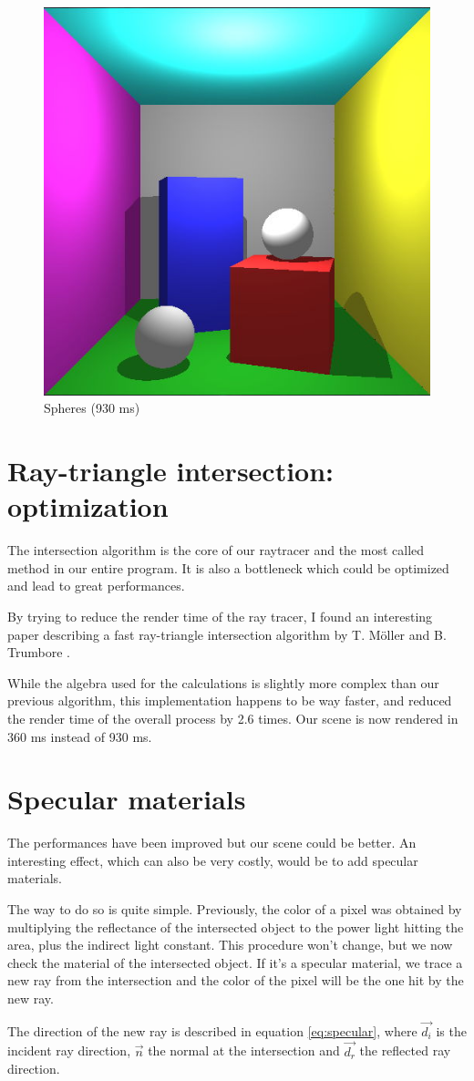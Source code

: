 \begin{figure}[H]
\centering
\includegraphics[width=0.35\linewidth]{img/spheres.jpg}
\caption{Spheres (930 ms)}
\end{figure}


\section{Ray-triangle intersection: optimization}
The intersection algorithm is the core of our raytracer and the most called method in our entire program. It is also a bottleneck which could be optimized and lead to great performances.

By trying to reduce the render time of the ray tracer, I found an interesting paper describing a fast ray-triangle intersection algorithm by T. Möller and B. Trumbore \cite{moller2005fast}.

While the algebra used for the calculations is slightly more complex than our previous algorithm, this implementation happens to be way faster, and reduced the render time of the overall process by 2.6 times. Our scene is now rendered in 360 ms instead of 930 ms.


\section{Specular materials}
The performances have been improved but our scene could be better. An interesting effect, which can also be very costly, would be to add specular materials.

The way to do so is quite simple. Previously, the color of a pixel was obtained by multiplying the reflectance of the intersected object to the power light hitting the area, plus the indirect light constant. This procedure won't change, but we now check the material of the intersected object. If it's a specular material, we trace a new ray from the intersection and the color of the pixel will be the one hit by the new ray.

The direction of the new ray is described in equation \ref{eq:specular}, where $\vec{d_i}$ is the incident ray direction, $\vec{n}$ the normal at the intersection and $\vec{d_r}$ the reflected ray direction.

